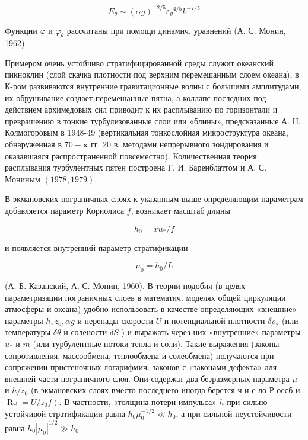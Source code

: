 \documentclass[10pt]{article}
\begin{document}
\[

E_{\theta} \sim(\alpha g)^{-2 / 5} \varepsilon_{\theta}{ }^{4 / 5} k^{-7 / 5}

\]



Функции $\varphi$ и $\varphi_{\theta}$ рассчитаны при помощи динамич. уравнений (А. С. Монин, 1962).



Примером очень устойчиво стратифицированной среды служит океанский пикноклин (слой скачка плотности под верхним перемешанным слоем океана), в К-ром развиваются внутренние гравитационные волны с большими амплитудами, их обрушивание создает перемешанные пятна, а коллапс последних под действием архимедовых сил приводит к их расплыванию по горизонтали и преврашению в тонкие турбулизованные слои или «блины», предсказанные А. Н. Колмогоровым в 1948-49 (вертикальная тонкослойная микроструктура океана, обнаруженная в $70-\mathbf{x}$ гг. 20 в. методами непрерывного зондирования и оказавшаяся распространенной повсеместно). Количественная теория расплывания турбулентных пятен построена Г. И. Баренблаттом и А. С. Мониным $(1978,1979)$.



В экмановских пограничных слоях к указанным выше определяющим параметрам добавляется параметр Кориолиса $f$, возникает масштаб длины



\[

h_{0}=x u_{*} / f

\]



и появляется внутренний параметр стратификации



\[

\mu_{0}=h_{0} / L

\]



(А. Б. Казанский, А. С. Монин, 1960). В теории подобия (в целях параметризации пограничных слоев в математич. моделях общей циркуляции атмосферы и океана) удобно использовать в качестве определяющих «внешние» параметры $h, z_{0}, \alpha g$ и перепады скорости $U$ и потенциальной плотности $\delta \rho_{*}$ (или температуры $\delta \theta$ и солености $\delta S$ ) и выражать через них «внутренние» параметры $u_{*}$ и $m$ (или турбулентные потоки тепла и соли). Такие выражения (законы сопротивления, массообмена, теплообмена и солеобмена) получаются при сопряжении пристеночных логарифмич. законов с «законами дефекта» лля внешней части пограничного слоя. Они содержат два безразмерных параметра $\mu$ и $h / z_{0}$ (в экмановских слоях вместо последнего иногда берется ч и с ло Р оссб и $\left.\operatorname{Ro}=U / z_{0} f\right)$. В частности, «толщина потери импульса» $h$ при сильно устойчивой стратификации равна $h_{0} \mu_{0}^{-1 / 2} \ll h_{0}$, а при сильной неустойчивости равна $h_{0}\left|\mu_{0}\right|^{1 / 2} \gg h_{0}$
\end{document}

